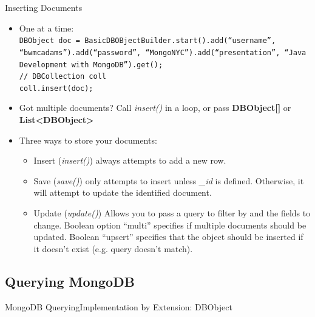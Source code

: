 \documentclass{beamer}
\begin{document}
\begin{frame}{Inserting Documents}
    \begin{itemize}
        \item One at a time:\\
            \texttt{\tiny DBObject doc = BasicDBOBjectBuilder.start().add(``username'', ``bwmcadams'').add(``password'', ``MongoNYC'').add(``presentation'', ``Java Development with MongoDB'').get();\\
            // DBCollection coll\\
            coll.insert(doc);\\
            }
        \item Got multiple documents? Call {\em insert()} in a loop, or pass {\bf DBObject[]} or {\bf List<DBObject>}
        \item Three ways to store your documents:
        \begin{itemize}
            \item {\sc Insert} ({\em insert()}) always attempts to add a new row.
            \item {\sc Save} ({\em save()}) only attempts to insert unless {\em \_id} is defined.  Otherwise, it will attempt to update the identified document.
            \item {\sc Update} ({\em update()}) Allows you to pass a query to filter by and the fields to change.  Boolean option ``multi'' specifies if multiple documents should be updated.  Boolean ``upsert'' specifies that the object should be inserted if it doesn't exist (e.g. query doesn't match).
        \end{itemize}
    \end{itemize}
\end{frame}

\subsection[Querying MongoDB]{Querying MongoDB}

\begin{frame}{MongoDB Querying}{Implementation by Extension: DBObject}
\end{frame}
\end{document}
